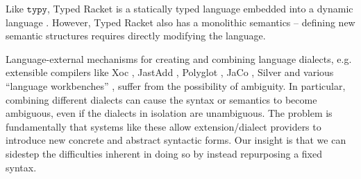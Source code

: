 \documentclass[preprint,10pt]{sigplanconf}
\newcommand{\typy}{\texttt{typy}}
\begin{document}
Like $\typy$, Typed Racket is a statically typed language embedded into a dynamic language \cite{TypedScheme2008}. However, Typed Racket also has a monolithic semantics -- defining new semantic structures requires directly modifying the language.



Language-external mechanisms for creating and combining language dialects, e.g. extensible compilers like Xoc \cite{conf/asplos/CoxBCKK08}, JastAdd \cite{Ekman:2007:JEJ:1297027.1297029}, Polyglot \cite{Nystrom-Clarkson-Myers03}, JaCo \cite{zenger2001implementing}, Silver \cite{VanWyk:2010:SEA} and various ``language workbenches'' \cite{erdweg2013state}, suffer from the possibility of ambiguity. In particular, combining different dialects can cause the syntax or semantics to become ambiguous, even if the dialects in isolation are unambiguous. The problem is fundamentally that systems like these allow extension/dialect providers to introduce new concrete and abstract syntactic forms. Our insight is that we can sidestep the difficulties inherent in doing so by instead repurposing a fixed syntax. %

\end{document}
